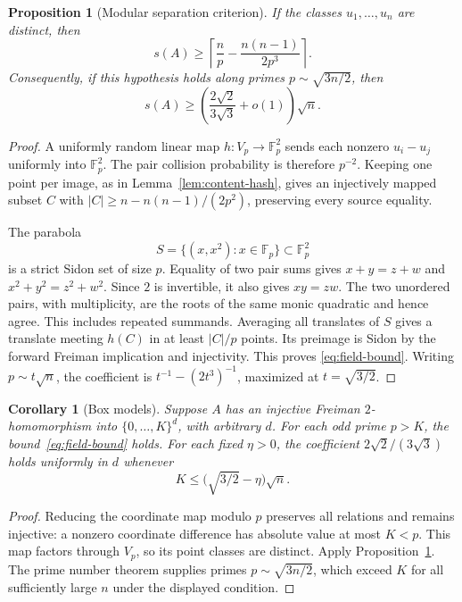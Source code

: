 \documentclass[11pt]{article}
\newtheorem{proposition}[theorem]{Proposition}
\newtheorem{corollary}[theorem]{Corollary}
\theoremstyle{definition}
\theoremstyle{remark}
\newcommand{\F}{\mathbb F}
\newcommand{\ceil}[1]{\left\lceil #1\right\rceil}
\begin{document}
\begin{proposition}[Modular separation criterion]\label{prop:modular-separation}
If the classes $u_1,\ldots,u_n$ are distinct, then
\begin{equation}\label{eq:field-bound}
s(A)\ge\ceil{\frac np-\frac{n(n-1)}{2p^3}}.
\end{equation}
Consequently, if this hypothesis holds along primes
$p\sim\sqrt{3n/2}$, then
\[
s(A)\ge\left(\frac{2\sqrt2}{3\sqrt3}+o(1)\right)\sqrt n.
\]
\end{proposition}
\begin{proof}
A uniformly random linear map $h:V_p\to\F_p^2$ sends each nonzero
$u_i-u_j$ uniformly into $\F_p^2$. The pair collision probability is
therefore $p^{-2}$. Keeping one point per image, as in
Lemma~\ref{lem:content-hash}, gives an injectively mapped subset $C$
with $|C|\ge n-n(n-1)/(2p^2)$, preserving every source equality.

The parabola
\[
S=\{(x,x^2):x\in\F_p\}\subset\F_p^2
\]
is a strict Sidon set of size $p$. Equality of two pair sums gives
$x+y=z+w$ and $x^2+y^2=z^2+w^2$. Since $2$ is invertible, it also gives
$xy=zw$. The two unordered pairs, with multiplicity, are the roots of
the same monic quadratic and hence agree. This includes repeated
summands. Averaging all translates of $S$ gives a translate meeting
$h(C)$ in at least $|C|/p$ points. Its preimage is Sidon by the forward
Freiman implication and injectivity. This proves
\eqref{eq:field-bound}. Writing $p\sim t\sqrt n$, the coefficient is
$t^{-1}-(2t^3)^{-1}$, maximized at $t=\sqrt{3/2}$.
\end{proof}

\begin{corollary}[Box models]\label{cor:box-model}
Suppose $A$ has an injective Freiman $2$-homomorphism into
$\{0,\ldots,K\}^d$, with arbitrary $d$.
For each odd prime $p>K$, the bound~\eqref{eq:field-bound} holds.
For each fixed $\eta>0$,
the coefficient $2\sqrt2/(3\sqrt3)$ holds uniformly in $d$ whenever
\[
K\le\bigl(\sqrt{3/2}-\eta\bigr)\sqrt n.
\]
\end{corollary}
\begin{proof}
Reducing the coordinate map modulo $p$ preserves all relations and
remains injective: a nonzero coordinate difference has absolute value
at most $K<p$. This map factors through $V_p$, so its point classes
are distinct. Apply Proposition~\ref{prop:modular-separation}.
The prime number theorem supplies primes $p\sim\sqrt{3n/2}$, which
exceed $K$ for all sufficiently large $n$ under the displayed condition.
\end{proof}
\end{document}
